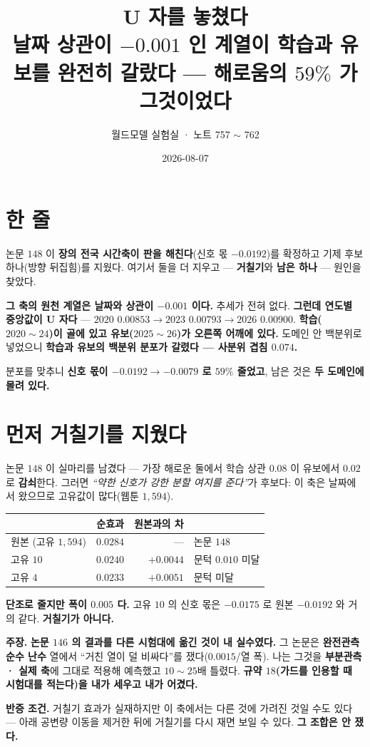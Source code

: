 \documentclass[10pt,a4paper]{article}
\title{\bfseries U 자를 놓쳤다\\[2pt]
\large 날짜 상관이 $-0.001$ 인 계열이 학습과 유보를 완전히 갈랐다 --- 해로움의
$59\%$ 가 그것이었다}
\author{월드모델 실험실 · 노트 757 $\sim$ 762}
\date{2026-08-07}
\newcommand{\claim}[2]{\begin{claimbox}\textbf{주장.} #1\par\smallskip
  \textcolor{gray!70}{\textbf{반증 조건.} #2}\end{claimbox}}
\begin{document}
\maketitle

\section{한 줄}

논문 $148$ 이 \textbf{장의 전국 시간축이 판을 해친다}(신호 몫 $-0.0192$)를 확정하고
기제 후보 하나(방향 뒤집힘)를 지웠다. 여기서 둘을 더 지우고 --- \textbf{거칠기}와
\textbf{남은 하나} --- 원인을 찾았다.

\textbf{그 축의 원천 계열은 날짜와 상관이 $\mathbf{-0.001}$ 이다.} 추세가 전혀 없다.
\textbf{그런데 연도별 중앙값이 U 자다} --- $2020$ $0.00853 \to 2023$ $\mathbf{0.00793}
\to 2026$ $\mathbf{0.00900}$. \textbf{학습($2020{\sim}24$)이 골에 있고 유보($2025{\sim}26$)가
오른쪽 어깨에 있다.} 도메인 안 백분위로 넣었으니 \textbf{학습과 유보의 백분위 분포가
갈렸다 --- 사분위 겹침 $0.074$.}

분포를 맞추니 \textbf{신호 몫이 $-0.0192 \to -0.0079$ 로 $59\%$ 줄었고}, 남은 것은
\textbf{두 도메인에 몰려 있다.}

\section{먼저 거칠기를 지웠다}

논문 $148$ 이 실마리를 남겼다 --- 가장 해로운 둘에서 학습 상관 $0.08$ 이 유보에서
$0.02$ 로 \textbf{감쇠}한다. 그러면 \emph{``약한 신호가 강한 분할 여지를 준다''}가
후보다: 이 축은 날짜에서 왔으므로 고유값이 많다(웹툰 $1{,}594$).

\begin{center}
\begin{tabular}{lrrl}
\toprule
& 순효과 & 원본과의 차 & \\
\midrule
원본 (고유 $1{,}594$) & $0.0284$ & --- & 논문 $148$ \\
고유 $10$ & $0.0240$ & $+0.0044$ & 문턱 $0.010$ 미달 \\
고유 $4$ & $0.0233$ & $+0.0051$ & 문턱 미달 \\
\bottomrule
\end{tabular}
\end{center}

\textbf{단조로 줄지만 폭이 $0.005$ 다.} 고유 $10$ 의 신호 몫은 $-0.0175$ 로 원본
$-0.0192$ 와 거의 같다. \textbf{거칠기가 아니다.}

\claim{\textbf{논문 $146$ 의 결과를 다른 시험대에 옮긴 것이 내 실수였다.} 그 논문은
\textbf{완전관측 순수 난수} 열에서 ``거친 열이 덜 비싸다''를 쟀다($0.0015$/열 폭).
나는 그것을 \textbf{부분관측 · 실제 축}에 그대로 적용해 예측했고 $10{\sim}25$배
틀렸다. \textbf{규약 $18$(가드를 인용할 때 시험대를 적는다)을 내가 세우고 내가
어겼다.}}
{거칠기 효과가 실재하지만 이 축에서는 다른 것에 가려진 것일 수도 있다 --- 아래 공변량
이동을 제거한 뒤에 거칠기를 다시 재면 보일 수 있다. \textbf{그 조합은 안 쟀다.}}
\end{document}

